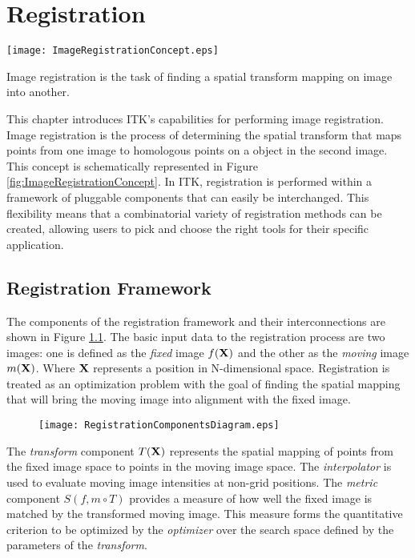 
\chapter{Registration}

\begin{floatingfigure}[rlp]{8cm}
  \centering
  \texttt{[image: ImageRegistrationConcept.eps]}
  \caption[Image Registration Concept]{Image registration is the task of
finding a spatial transform mapping on image into
another.\label{fig:ImageRegistrationConcept}}
\end{floatingfigure}

This chapter introduces ITK's capabilities for performing image
registration. Image registration is the process of determining the spatial
transform that maps points from one image to homologous points on a object in
the second image. This concept is schematically represented in Figure
\ref{fig:ImageRegistrationConcept}. In ITK, registration is performed within
a framework of pluggable components that can easily be interchanged.  This
flexibility means that a combinatorial variety of registration methods can be
created, allowing users to pick and choose the right tools for their specific
application.


\section{Registration Framework}
The components of the registration framework and their interconnections are
shown in Figure \ref{fig:RegistrationComponents}. The basic input data to the
registration process are two images: one is defined as the \emph{fixed} image
$f(\bf{X})$ and the other as the \emph{moving} image $m(\bf{X})$. Where
$\bf{X}$ represents a position in N-dimensional space. Registration is treated
as an optimization problem with the goal of finding the spatial mapping that
will bring the moving image into alignment with the fixed image.

\begin{figure}
\center
\texttt{[image: RegistrationComponentsDiagram.eps]}
\label{fig:RegistrationComponents}
\end{figure}

The \emph{transform} component $T(\bf{X})$ represents the spatial mapping of
points from the fixed image space to points in the moving image space. The
\emph{interpolator} is used to evaluate moving image intensities at non-grid
positions. The \emph{metric} component $S(f,m \circ T)$ provides a measure of
how well the fixed image is matched by the transformed moving image. This
measure forms the quantitative criterion to be optimized by the
\emph{optimizer} over the search space defined by the parameters of the
\emph{transform}.

